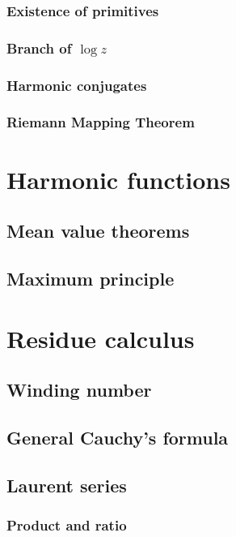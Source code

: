 \documentclass{article}
\begin{document}
  \subsubsection{Existence of primitives}
  \subsubsection{Branch of $\log z$}
  \subsubsection{Harmonic conjugates}
  \subsubsection{Riemann Mapping Theorem}



\section{Harmonic functions}

\subsection{Mean value theorems}

\subsection{Maximum principle}



\section{Residue calculus}

\subsection{Winding number}

\subsection{General Cauchy's formula}

\subsection{Laurent series}

\subsubsection{Product and ratio}
\end{document}
